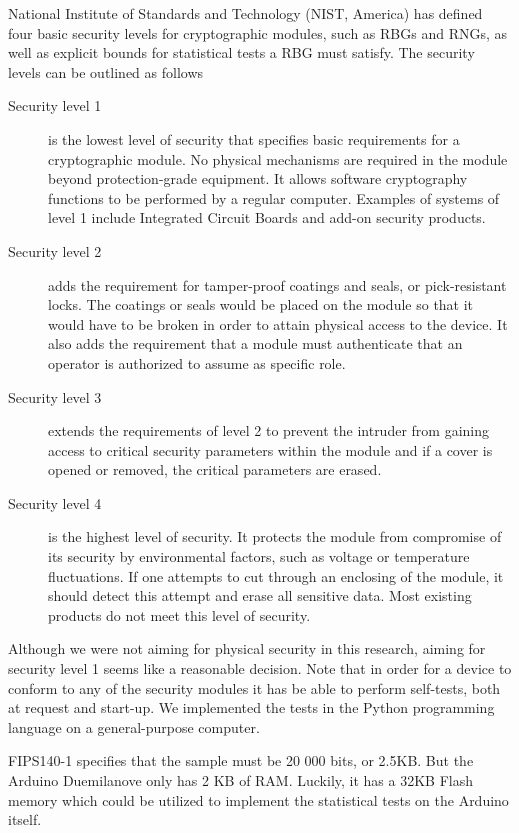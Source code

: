 \documentclass[a4paper]{article}           %
\begin{document}
National Institute of Standards and Technology (NIST, America) has defined ~\cite{fips140} four basic security levels for cryptographic modules, such as RBGs and RNGs, as well as explicit bounds for statistical tests a RBG must satisfy. The security levels can be outlined as follows

\begin{description}
\item[Security level 1] is the lowest level of security that specifies basic requirements for a cryptographic module. No physical mechanisms are required in the module beyond protection-grade equipment. It allows software cryptography functions to be performed by a regular computer. Examples of systems of level 1 include Integrated Circuit Boards and add-on security products. 

\item[Security level 2] adds the requirement for tamper-proof coatings and seals, or pick-resistant locks. The coatings or seals would be placed on the module so that it would have to be broken in order to attain physical access to the device. It also adds the requirement that a module must authenticate that an operator is authorized to assume as specific role. 

\item[Security level 3] extends the requirements of level 2 to prevent the intruder from gaining access to critical security parameters within the module and if a cover is opened or removed, the critical parameters are erased. 

\item[Security level 4] is the highest level of security. It protects the module from compromise of its security by environmental factors, such as voltage or temperature fluctuations. If one attempts to cut through an enclosing of the module, it should detect this attempt and erase all sensitive data. Most existing products do not meet this level of security. 
\end{description}

Although we were not aiming for physical security in this research, aiming for security level 1 seems like a reasonable decision. Note that in order for a device to conform to any of the security modules it has be able to perform self-tests, both at request and start-up. We implemented the tests in the Python programming language on a general-purpose computer. 

FIPS140-1 specifies that the sample must be 20 000 bits, or 2.5KB. But the Arduino Duemilanove only has 2 KB of RAM. Luckily, it has a 32KB Flash memory which could be utilized to implement the statistical tests on the Arduino itself. 
\end{document}
